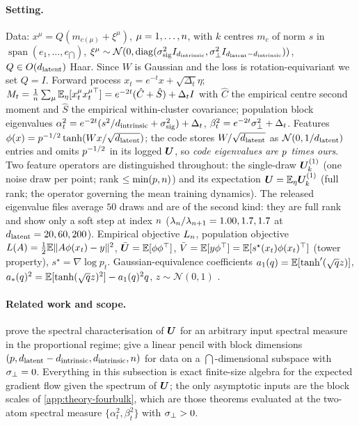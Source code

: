 \paragraph{Setting.}
Data: $x^\mu=Q(m_{c(\mu)}+\xi^\mu)$, $\mu=1,\dots,n$, with $k$ centres $m_c$ of norm $s$ in $\operatorname{span}(e_1,\dots,e_{\dint})$, $\xi^\mu\sim\mathcal N(0,\operatorname{diag}(\sigma_{\mathrm{sig}}^2I_{d_{\mathrm{intrinsic}}},\sigma_{\perp}^2I_{d_{\mathrm{latent}}-d_{\mathrm{intrinsic}}}))$, $Q\in O(d_{\mathrm{latent}})$ Haar. Since $W$ is Gaussian and the loss is rotation-equivariant we set $Q=I$. Forward process $x_t=e^{-t}x+\sqrt{\Delta_t}\eta$; $M_t=\tfrac1{n}\sum_\mu\mathbb{E}_\eta[x_t^\mu x_t^{\mu\top}]=e^{-2t}(\hat C+\hat S)+\Delta_tI$ with $\hat C$ the empirical centre second moment and $\hat S$ the empirical within-cluster covariance; population block eigenvalues $\alpha_t^2=e^{-2t}(s^2/d_{\mathrm{intrinsic}}+\sigma_{\mathrm{sig}}^2)+\Delta_t$, $\beta_t^2=e^{-2t}\sigma_{\perp}^2+\Delta_t$. Features $\phi(x)=p^{-1/2}\tanh(Wx/\sqrt{d_{\mathrm{latent}}})$; the code stores $W/\sqrt{d_{\mathrm{latent}}}$ as $\mathcal N(0,1/d_{\mathrm{latent}})$ entries and omits $p^{-1/2}$ in its logged $\bm{U}$, so \emph{code eigenvalues are $p$ times ours}. Two feature operators are distinguished throughout: the single-draw $\bm{U}^{(1)}_k$ (one noise draw per point; rank $\le\min(p,n)$) and its expectation $\bm{U}=\mathbb{E}_\eta\bm{U}^{(1)}_k$ (full rank; the operator governing the mean training dynamics). The released eigenvalue files average $50$ draws and are of the second kind: they are full rank and show only a soft step at index $n$ ($\lambda_{n}/\lambda_{n+1}=1.00,1.7,1.7$ at $d_{\mathrm{latent}}=20,60,200$). Empirical objective $L_{n}$, population objective $L(A)=\tfrac12\mathbb{E}\|A\phi(x_t)-y\|^2$, $\bar{\bm{U}}=\mathbb{E}[\phi\phi^{\top}]$, $\bar V=\mathbb{E}[y\phi^{\top}]=\mathbb{E}[s^\star(x_t)\phi(x_t)^{\top}]$ (tower property), $s^\star=\nabla\log p_t$. Gaussian-equivalence coefficients $a_1(q)=\mathbb{E}[\tanh'(\sqrt qz)]$, $a_*(q)^2=\mathbb{E}[\tanh(\sqrt qz)^2]-a_1(q)^2q$, $z\sim\mathcal N(0,1)$ \citep{pennington2017nonlinear,benigni2021eigenvalue,goldt2022gaussian,hu2022universality,mei2022generalization}.

\paragraph{Related work and scope.}
\citet{bonnaire2025} prove the spectral characterisation of $\bm{U}$ for an arbitrary input spectral measure in the proportional regime; \citet{george2025dsm} give a linear pencil with block dimensions $(p,d_{\mathrm{latent}}-d_{\mathrm{intrinsic}},d_{\mathrm{intrinsic}},n)$ for data on a $\dint$-dimensional subspace with $\sigma_{\perp}=0$. Everything in this subsection is exact finite-size algebra for the expected gradient flow given the spectrum of $\bm{U}$; the only asymptotic inputs are the block scales of \cref{app:theory-fourbulk}, which are those theorems evaluated at the two-atom spectral measure $\{\alpha_t^2,\beta_t^2\}$ with $\sigma_{\perp}>0$.

